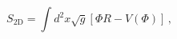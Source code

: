 \begin{equation*}
S_{\mathrm{2D}}=\int d^{2}x\sqrt{g}\left[ \Phi R-V\left( \Phi \right) \right]
\,,
\end{equation*}

